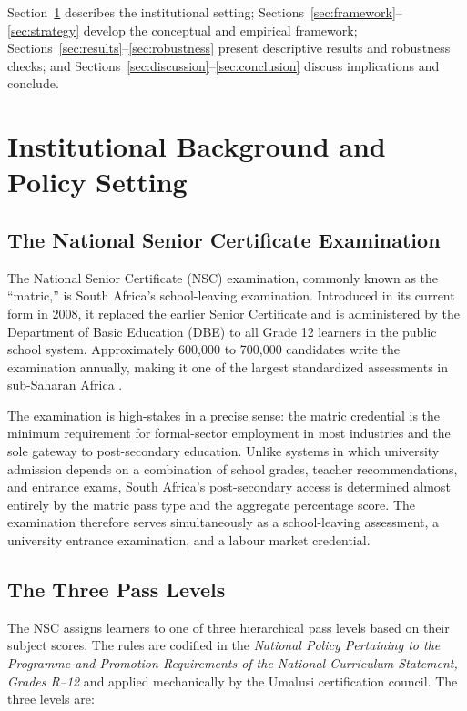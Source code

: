 \documentclass[12pt]{article}
\begin{document}
Section~\ref{sec:background} describes the institutional setting; Sections~\ref{sec:framework}--\ref{sec:strategy} develop the conceptual and empirical framework; Sections~\ref{sec:results}--\ref{sec:robustness} present descriptive results and robustness checks; and Sections~\ref{sec:discussion}--\ref{sec:conclusion} discuss implications and conclude.


\section{Institutional Background and Policy Setting}
\label{sec:background}

\subsection{The National Senior Certificate Examination}

The National Senior Certificate (NSC) examination, commonly known as the ``matric,'' is South Africa's school-leaving examination. Introduced in its current form in 2008, it replaced the earlier Senior Certificate and is administered by the Department of Basic Education (DBE) to all Grade 12 learners in the public school system. Approximately 600{,}000 to 700{,}000 candidates write the examination annually, making it one of the largest standardized assessments in sub-Saharan Africa \citep{dbe2022nsc}.

The examination is high-stakes in a precise sense: the matric credential is the minimum requirement for formal-sector employment in most industries and the sole gateway to post-secondary education. Unlike systems in which university admission depends on a combination of school grades, teacher recommendations, and entrance exams, South Africa's post-secondary access is determined almost entirely by the matric pass type and the aggregate percentage score. The examination therefore serves simultaneously as a school-leaving assessment, a university entrance examination, and a labour market credential.

\subsection{The Three Pass Levels}

The NSC assigns learners to one of three hierarchical pass levels based on their subject scores. The rules are codified in the \textit{National Policy Pertaining to the Programme and Promotion Requirements of the National Curriculum Statement, Grades R--12} and applied mechanically by the Umalusi certification council. The three levels are:
\end{document}

